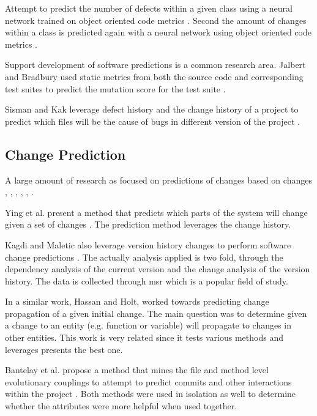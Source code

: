 Attempt to predict the number of defects within a given class using a neural network trained on object oriented code metrics \cite{Thwin2005}. Second the amount of changes within a class is predicted again with a neural network using object oriented code metrics \cite{Thwin2005}.

Support development of software predictions is a common research area. Jalbert and Bradbury used static metrics from both the source code and corresponding test suites to predict the mutation score for the test suite \cite{Jalbert2012}.

Sisman and Kak leverage defect history and the change history of a project to predict which files will be the cause of bugs in different version of the project \cite{Sisman2012}.

\subsection{Change Prediction}
A large amount of research as focused on predictions of changes based on changes \cite{Bantelay2013}, \cite{Chaturvedi2014}, \cite{Giger2012}, \cite{Hassan2004}, \cite{Kagdi2007}, \cite{Ying2004}. 

Ying et al. present a method that predicts which parts of the system will change given a set of changes \cite{Ying2004}. The prediction method leverages the change history.

Kagdi and Maletic also leverage version history changes to perform software change predictions \cite{Kagdi2007}. The actually analysis applied is two fold, through the dependency analysis of the current version and the change analysis of the version history. The data is collected through \gls{msr} which is a popular field of study. 

In a similar work, Hassan and Holt, worked towards predicting change propagation of a given initial change. \cite{Hassan2004} The main question was to determine given a change to an entity (e.g. function or variable) will propagate to changes in other entities. This work is very related since it tests various methods and leverages presents the best one.

Bantelay et al. propose a method that mines the file and method level evolutionary couplings to attempt to predict commits and other interactions within the project \cite{Bantelay2013}. Both methods were used in isolation as well to determine whether the attributes were more helpful when used together.

